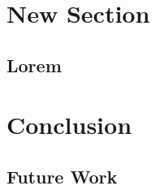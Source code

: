 \documentclass[12pt]{article}
\numberwithin{figure}{section}
\numberwithin{table}{section}
\begin{document}
\newpage
\section{New Section}
\subsection{Lorem}

\newpage
\section{Conclusion}
\subsection{Future Work}



\end{document}
